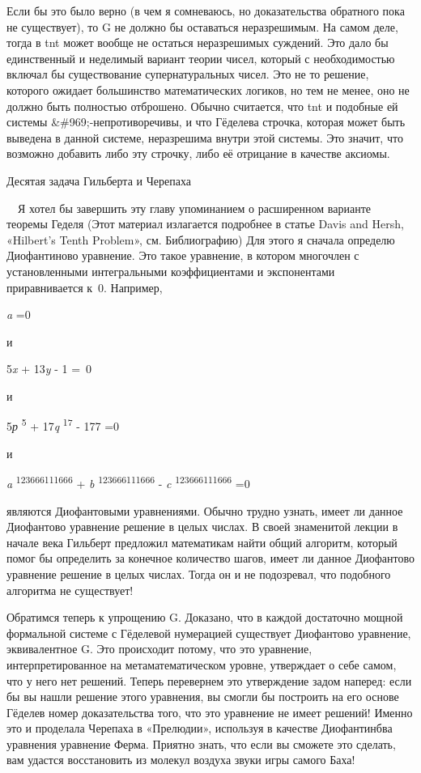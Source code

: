 \documentclass[../main.tex]{subfiles}
\begin{document}
Если бы это было верно (в чем я сомневаюсь, но доказательства обратного пока не существует), то G не должно бы оставаться неразрешимым. На самом деле, тогда в \acs{tnt} может вообще не остаться неразрешимых суждений. Это дало бы единственный и неделимый вариант теории чисел, который с необходимостью включал бы существование супернатуральных чисел. Это не то решение, которого ожидает большинство математических логиков, но тем не менее, оно не должно быть полностью отброшено. Обычно считается, что \acs{tnt} и подобные ей системы \&\#969;-непротиворечивы, и что Гёделева строчка, которая может быть выведена в данной системе, неразрешима внутри этой системы. Это значит, что возможно добавить либо эту строчку, либо её отрицание в качестве аксиомы.

Десятая задача Гильберта и Черепаха

~~Я хотел бы завершить эту главу упоминанием о расширенном варианте теоремы Геделя (Этот материал излагается подробнее в статье Davis and Hersh, «Hilbert's Tenth Problem», см. Библиографию) Для этого я сначала определю Диофантиново уравнение. Это такое уравнение, в котором многочлен с установленными интегральными коэффициентами и экспонентами приравнивается к~0. Например,

\emph{a} =0

и

5\emph{x} + 13\emph{y} - 1 =~0

и

5\emph{р} \textsuperscript{5} + 17\emph{q} \textsuperscript{17} - 177 =0

и

\emph{a} \textsuperscript{123666111666} + \emph{b} \textsuperscript{123666111666} - \emph{c} \textsuperscript{123666111666} =0

являются Диофантовыми уравнениями. Обычно трудно узнать, имеет ли данное Диофантово уравнение решение в целых числах. В своей знаменитой лекции в начале века Гильберт предложил математикам найти общий алгоритм, который помог бы определить за конечное количество шагов, имеет ли данное Диофантово уравнение решение в целых числах. Тогда он и не подозревал, что подобного алгоритма не существует!

Обратимся теперь к упрощению G. Доказано, что в каждой достаточно мощной формальной системе с Гёделевой нумерацией существует Диофантово уравнение, эквивалентное G. Это происходит потому, что это уравнение, интерпретированное на метаматематическом уровне, утверждает о себе самом, что у него нет решений. Теперь перевернем это утверждение задом наперед: если бы вы нашли решение этого уравнения, вы смогли бы построить на его основе Гёделев номер доказательства того, что это уравнение не имеет решений! Именно это и проделала Черепаха в «Прелюдии», используя в качестве Диофантинбва уравнения уравнение Ферма. Приятно знать, что если вы сможете это сделать, вам удастся восстановить из молекул воздуха звуки игры самого Баха!
\end{document}
